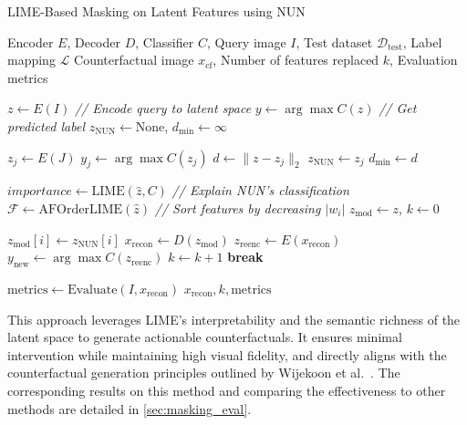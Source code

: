 \begin{algorithm}[h]
\caption{LIME-Based Masking on Latent Features using NUN}
\label{alg:nun_lime}
\begin{algorithmic}[1]
\REQUIRE Encoder $E$, Decoder $D$, Classifier $C$, Query image $I$, Test dataset $\mathcal{D}_{\text{test}}$, Label mapping $\mathcal{L}$
\ENSURE Counterfactual image $x_{\text{cf}}$, Number of features replaced $k$, Evaluation metrics

\STATE $z \leftarrow E(I)$ \hfill \textit{// Encode query to latent space}
\STATE $y \leftarrow \arg\max C(z)$ \hfill \textit{// Get predicted label}
\STATE $z_{\text{NUN}} \leftarrow \text{None}$, $d_{\min} \leftarrow \infty$

    \STATE $z_j \leftarrow E(J)$
    \STATE $y_j \leftarrow \arg\max C(z_j)$
        \STATE $d \leftarrow \|z - z_j\|_2$
            \STATE $z_{\text{NUN}} \leftarrow z_j$
            \STATE $d_{\min} \leftarrow d$
        \ENDIF
    \ENDIF
\ENDFOR

\STATE $importance \leftarrow \text{LIME}(\hat{z}, C)$ \hfill \textit{// Explain NUN's classification}
\STATE $\mathcal{F} \leftarrow \text{AFOrderLIME}(\hat{z})$ \hfill \textit{// Sort features by decreasing $|w_i|$}
\STATE $z_{\text{mod}} \leftarrow z$, $k \leftarrow 0$

    \STATE $z_{\text{mod}}[i] \leftarrow z_{\text{NUN}}[i]$
    \STATE $x_{\text{recon}} \leftarrow D(z_{\text{mod}})$
    \STATE $z_{\text{reenc}} \leftarrow E(x_{\text{recon}})$
    \STATE $y_{\text{new}} \leftarrow \arg\max C(z_{\text{reenc}})$
    \STATE $k \leftarrow k + 1$
        \STATE \textbf{break}
    \ENDIF
\ENDFOR

\STATE $\text{metrics} \leftarrow \text{Evaluate}(I, x_{\text{recon}})$
\RETURN $x_{\text{recon}}, k, \text{metrics}$
\end{algorithmic}
\end{algorithm}


This approach leverages LIME’s interpretability and the semantic richness of the latent space to generate actionable counterfactuals. It ensures minimal intervention while maintaining high visual fidelity, and directly aligns with the counterfactual generation principles outlined by Wijekoon et al.~\cite{WijekoonWNMPC21}. The corresponding results on this method and comparing the effectiveness to other methods are detailed in \cref{sec:masking_eval}.